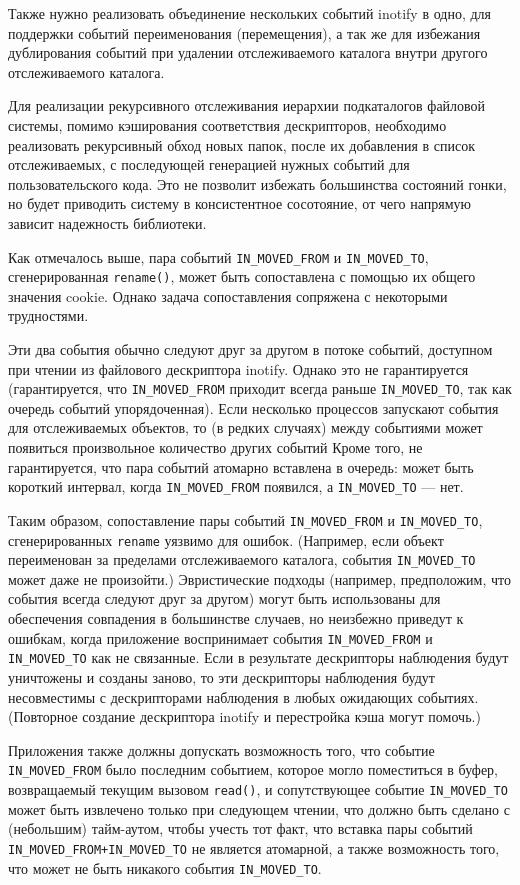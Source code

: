\documentclass[14pt, russian]{scrartcl}
\newcommand{\code}[1]{\texttt{#1}}
\begin{document}
Также нужно реализовать объединение нескольких событий inotify в одно, для
поддержки событий переименования (перемещения), а так же для избежания
дублирования событий при удалении отслеживаемого каталога внутри другого
отслеживаемого каталога.

Для реализации рекурсивного отслеживания иерархии подкаталогов файловой системы,
помимо кэширования соответствия дескрипторов, необходимо реализовать рекурсивный
обход новых папок, после их добавления в список отслеживаемых, с последующей
генерацией нужных событий для пользовательского кода. Это не позволит избежать
большинства состояний гонки, но будет приводить систему в консистентное
сосотояние, от чего напрямую зависит надежность библиотеки.

Как отмечалось выше, пара событий \code{IN\_MOVED\_FROM} и \code{IN\_MOVED\_TO},
сгенерированная \code{rename()}, может быть сопоставлена с помощью их общего
значения cookie. Однако задача сопоставления сопряжена с некоторыми трудностями.

Эти два события обычно следуют друг за другом в потоке событий, доступном при
чтении из файлового дескриптора inotify. Однако это не гарантируется
(гарантируется, что \code{IN\_MOVED\_FROM} приходит всегда раньше
\code{IN\_MOVED\_TO}, так как очередь событий упорядоченная). Если несколько
процессов запускают события для отслеживаемых объектов, то (в редких случаях)
между событиями может появиться произвольное количество других событий Кроме
того, не гарантируется, что пара событий атомарно вставлена в очередь: может
быть короткий интервал, когда \code{IN\_MOVED\_FROM} появился, а
\code{IN\_MOVED\_TO} --- нет.

Таким образом, сопоставление пары событий \code{IN\_MOVED\_FROM} и
\code{IN\_MOVED\_TO}, сгенерированных \code{rename} уязвимо для ошибок.
(Например, если объект переименован за пределами отслеживаемого каталога,
события \code{IN\_MOVED\_TO} может даже не произойти.) Эвристические подходы
(например, предположим, что события всегда следуют друг за другом) могут быть
использованы для обеспечения совпадения в большинстве случаев, но неизбежно
приведут к ошибкам, когда приложение воспринимает события \code{IN\_MOVED\_FROM}
и \code{IN\_MOVED\_TO} как не связанные. Если в результате дескрипторы наблюдения будут
уничтожены и созданы заново, то эти дескрипторы наблюдения будут несовместимы с
дескрипторами наблюдения в любых ожидающих событиях. (Повторное создание
дескриптора inotify и перестройка кэша могут помочь.)

Приложения также должны допускать возможность того, что событие
\code{IN\_MOVED\_FROM} было последним событием, которое могло поместиться в
буфер, возвращаемый текущим вызовом \code{read()}, и сопутствующее событие
\code{IN\_MOVED\_TO} может быть извлечено только при следующем чтении, что
должно быть сделано с (небольшим) тайм-аутом, чтобы учесть тот факт, что вставка
пары событий \code{IN\_MOVED\_FROM+IN\_MOVED\_TO} не является атомарной, а также
возможность того, что может не быть никакого события \code{IN\_MOVED\_TO}.
\end{document}
